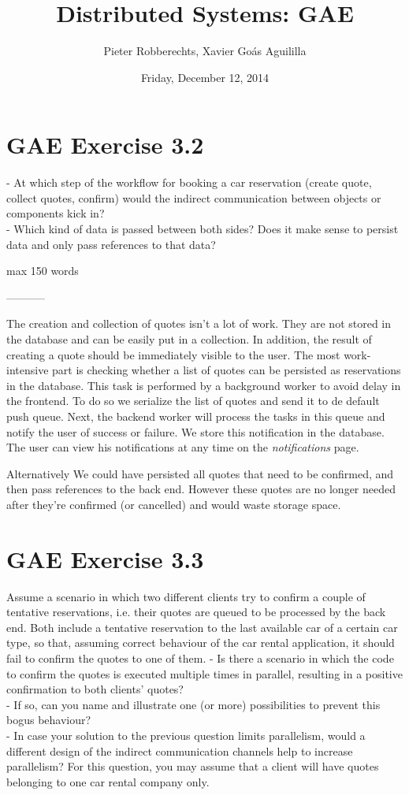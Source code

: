 \documentclass[11pt]{article}
\author{Pieter Robberechts, Xavier Goás Aguililla}
\date{Friday, December 12, 2014}
\title{Distributed Systems: GAE}
\begin{document}
\maketitle

\section*{GAE Exercise 3.2}
\label{sec-3.2}
- At which step of the workflow for booking a car reservation (create quote, collect quotes, confirm) would the indirect communication between objects or components kick in?\\
- Which kind of data is passed between both sides? Does it make sense to persist data and only pass references to that data?

max 150 words

-----------

The creation and collection of quotes isn't a lot of work. They are not stored in the database and can be easily put in a collection.
In addition, the result of creating a quote should be immediately visible to the user. The most work-intensive part is checking whether
a list of quotes can be persisted as reservations in the database. This task is performed by a background worker to avoid delay in the frontend. To do so
we serialize the list of quotes and send it to de default push queue. Next, the backend worker will process the tasks in this queue and
notify the user of success or failure. We store this notification in the database. The user can view his notifications at any
time on the \textit{notifications} page.

Alternatively We could have persisted all quotes that need to be confirmed, and then pass references to the back end. However these quotes are
no longer needed after they’re confirmed (or cancelled) and would waste storage space.

\section*{GAE Exercise 3.3}

Assume a scenario in which two different clients try to confirm a couple of tentative reservations, i.e. their quotes are queued to be processed by the back end.
Both include a tentative reservation to the last available car of a certain car type, so that, assuming correct behaviour of the car rental application, it should
fail to confirm the quotes to one of them.
- Is there a scenario in which the code to confirm the quotes is executed multiple times in parallel, resulting in a positive confirmation to both clients’ quotes?\\
- If so, can you name and illustrate one (or more) possibilities to prevent this bogus behaviour?\\
- In case your solution to the previous question limits parallelism, would a different design of the indirect communication channels help to increase parallelism?
For this question, you may assume that a client will have quotes belonging to one car rental company only.\\
\end{document}
